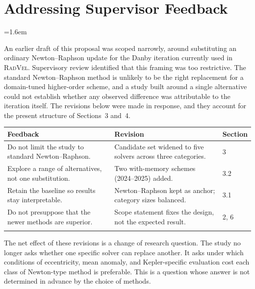 \documentclass[11pt,a4paper]{article}
\renewcommand{\arraystretch}{1.3}
\begin{document}
\section*{Addressing Supervisor Feedback}
\begingroup\emergencystretch=1.6em

An earlier draft of this proposal was scoped narrowly, around substituting an
ordinary Newton--Raphson update for the Danby iteration currently used in
\textsc{RadVel}. Supervisory review identified that this framing was too
restrictive. The standard Newton--Raphson method is unlikely to be the right
replacement for a domain-tuned higher-order scheme, and a study built around a
single alternative could not establish whether any observed difference was
attributable to the iteration itself. The revisions below were made in
response, and they account for the present structure of Sections~3 and~4.

\vspace{0.5em}
\begingroup
\small
\setlength{\tabcolsep}{5.5pt}
\renewcommand{\arraystretch}{1.15}
\begin{tabularx}{\textwidth}{@{}>{\raggedright\arraybackslash}X >{\raggedright\arraybackslash}X >{\raggedright\arraybackslash}p{1.3cm}@{}}
\toprule
\textbf{Feedback} & \textbf{Revision} & \textbf{Section} \\
\midrule
Do not limit the study to standard Newton--Raphson.
& Candidate set widened to five solvers across three categories.
& \textcolor{Accent}{3} \\
\addlinespace[0.55em]
Explore a range of alternatives, not one substitution.
& Two with-memory schemes (2024--2025) added.
& \textcolor{Accent}{3.2} \\
\addlinespace[0.55em]
Retain the baseline so results stay interpretable.
& Newton--Raphson kept as anchor; category sizes balanced.
& \textcolor{Accent}{3.1} \\
\addlinespace[0.55em]
Do not presuppose that the newer methods are superior.
& Scope statement fixes the design, not the expected result.
& \textcolor{Accent}{2, 6} \\
\addlinespace[0.35em]
\bottomrule
\end{tabularx}
\endgroup

\vspace{0.4em}
\begin{note}
The net effect of these revisions is a change of research question. The study
no longer asks whether one specific solver can replace another. It asks under which
conditions of eccentricity, mean anomaly, and Kepler-specific evaluation cost
each class of Newton-type method is preferable. This is a question whose
answer is not determined in advance by the choice of methods.
\end{note}
\endgroup
\end{document}
